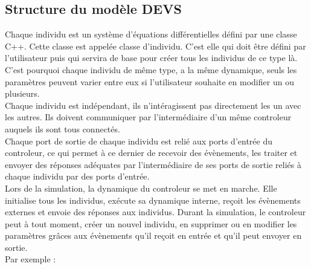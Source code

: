 \subsection{Structure du modèle DEVS}
Chaque individu est un système d'équations différentielles défini par une classe C++. Cette classe est appelée classe d'individu. C'est elle qui doit être défini par l'utilisateur puis qui servira de base pour créer tous les individus de ce type là. C'est pourquoi chaque individu de même type, a la même dynamique, seuls les paramètres peuvent varier entre eux si l'utilisateur souhaite en modifier un ou plusieurs.\\
Chaque individu est indépendant, ils n'intéragissent pas directement les un avec les autres. Ils doivent communiquer par l'intermédiaire d'un même controleur auquels ils sont tous connectés.\\
Chaque port de sortie de chaque individu est relié aux ports d'entrée du controleur, ce qui permet à ce dernier de recevoir des évènements, les traiter et envoyer des réponses adéquates par l'intermédiaire de ses ports de sortie reliés à chaque individu par des ports d'entrée.\\
Lors de la simulation, la dynamique du controleur se met en marche. Elle initialise tous les individus, exécute sa dynamique interne, reçoit les évènements externes et envoie des réponses aux individus. Durant la simulation, le controleur peut à tout moment, créer un nouvel individu, en supprimer ou en modifier les paramètres grâces aux évènements qu'il reçoit en entrée et qu'il peut envoyer en sortie.\\
Par exemple :\\
\noindent\begin{minipage}{\linewidth}%
\end{minipage}

